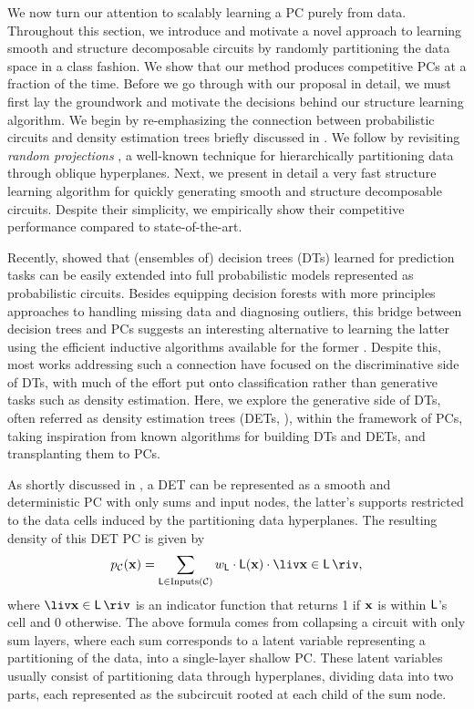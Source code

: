 We now turn our attention to scalably learning a PC purely from data. Throughout this section, we
introduce and motivate a novel approach to learning smooth and structure decomposable circuits by
randomly partitioning the data space in a \divclass{} class fashion. We show that our method
produces competitive PCs at a fraction of the time. Before we go through with our proposal in
detail, we must first lay the groundwork and motivate the decisions behind our structure learning
algorithm. We begin by re-emphasizing the connection between probabilistic circuits and density
estimation trees briefly discussed in . We follow by revisiting \emph{random
projections} \citep{dasgupta08a,dasgupta08b}, a well-known technique for hierarchically
partitioning data through oblique hyperplanes. Next, we present in detail a very fast structure
learning algorithm for quickly generating smooth and structure decomposable circuits. Despite their
simplicity, we empirically show their competitive performance compared to state-of-the-art.

Recently, \citet{correia20} showed that (ensembles of) decision trees (DTs) learned for prediction
tasks can be easily extended into full probabilistic models represented as probabilistic circuits.
Besides equipping decision forests with more principles approaches to handling missing data and
diagnosing outliers, this bridge between decision trees and PCs suggests an interesting alternative
to learning the latter using the efficient inductive algorithms available for the former
\citep{correia20,ram11,khosravi20}. Despite this, most works addressing such a connection have
focused on the discriminative side of DTs, with much of the effort put onto classification rather
than generative tasks such as density estimation. Here, we explore the generative side of DTs,
often referred as density estimation trees (DETs, \cite{ram11,hang19,smyth95}), within the framework
of PCs, taking inspiration from known algorithms for building DTs and DETs, and transplanting them
to PCs. 

As shortly discussed in , a DET can be represented as a smooth and deterministic PC
with only sums and input nodes, the latter's supports restricted to the data cells induced by the
partitioning data hyperplanes. The resulting density of this DET PC is given by
\begin{equation*}
  p_\mathcal{C}(\set{x})=\sum_{\Leaf\in\operatorname{Inputs}(\mathcal{C})}w_{\Leaf}\cdot\Leaf(\set{x})\cdot\liv\set{x}\in\Leaf\riv,
\end{equation*}
where $\liv\set{x}\in\Leaf\riv$ is an indicator function that returns 1 if $\mathbf{x}$ is within
$\operatorname{\textup{\textsf{L}}}$'s cell and 0 otherwise. The above formula comes from collapsing a circuit with only sum
layers, where each sum corresponds to a latent variable representing a partitioning of the data,
into a single-layer shallow PC. These latent variables usually consist of partitioning data through
hyperplanes, dividing data into two parts, each represented as the subcircuit rooted at each child
of the sum node.


